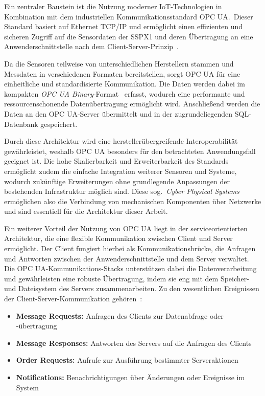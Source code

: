 Ein zentraler Baustein ist die Nutzung moderner IoT-Technologien in Kombination mit dem industriellen Kommunikationsstandard OPC UA.\
Dieser Standard basiert auf Ethernet TCP/IP und ermöglicht einen effizienten und sicheren Zugriff auf die Sensordaten der SSPX1 und
deren Übertragung an eine Anwenderschnittstelle nach dem Client-Server-Prinzip~\cite[S.~470]{Babel2024}.

Da die Sensoren teilweise von unterschiedlichen Herstellern stammen und Messdaten in verschiedenen Formaten bereitstellen, sorgt OPC
UA für eine einheitliche und standardisierte Kommunikation. Die Daten werden dabei im kompakten \textit{OPC UA Binary}-Format~\cite{iec62541}
erfasst, wodurch eine performante und ressourcenschonende Datenübertragung ermöglicht wird. Anschließend werden die Daten an den OPC
UA-Server übermittelt und in der zugrundeliegenden SQL-Datenbank gespeichert. 

Durch diese Architektur wird eine herstellerübergreifende Interoperabilität gewährleistet, weshalb OPC UA besonders für den betrachteten
Anwendungsfall geeignet ist. Die hohe Skalierbarkeit und Erweiterbarkeit des Standards ermöglicht zudem die einfache Integration
weiterer Sensoren und Systeme, wodurch zukünftige Erweiterungen ohne grundlegende Anpassungen der bestehenden Infrastruktur möglich
sind. Diese sog.~\textit{Cyber Physical Systems} ermöglichen also die Verbindung von mechanischen Komponenten über Netzwerke und sind
essentiell für die Architektur dieser Arbeit.

Ein weiterer Vorteil der Nutzung von OPC UA liegt in der serviceorientierten Architektur, die eine flexible Kommunikation
zwischen Client und Server ermöglicht. Der Client fungiert hierbei als Kommunikationsbrücke, die Anfragen und Antworten zwischen
der Anwenderschnittstelle und dem Server verwaltet. Die OPC UA-Kommunikations-Stacks unterstützen dabei die Datenverarbeitung und
gewährleisten eine robuste Übertragung, indem sie eng mit dem Speicher- und Dateisystem des Servers zusammenarbeiten. Zu den
wesentlichen Ereignissen der Client-Server-Kommunikation gehören~\cite{Babel2024,iec62541,Mao2024}:
\begin{itemize}
    \item \textbf{Message Requests:} Anfragen des Clients zur Datenabfrage oder -übertragung
    \item \textbf{Message Responses:} Antworten des Servers auf die Anfragen des Clients
    \item \textbf{Order Requests:} Aufrufe zur Ausführung bestimmter Serveraktionen
    \item \textbf{Notifications:} Benachrichtigungen über Änderungen oder Ereignisse im System
\end{itemize}

